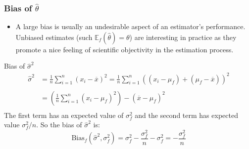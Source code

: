 \frame
{
\frametitle{Bias of $\hat{\theta}$}

\begin{itemize}
\item A large bias is usually an undesirable aspect of an estimator's performance. \alert{Unbiased estimates} (such $\mathbb{E}_f(\hat{\theta})=\theta$) are interesting in practice as they promote a nice feeling of scientific objectivity in the estimation process. 
\end{itemize}

\begin{exampleblock}{Bias of $\hat{\sigma}^2$}
$$
\begin{array}{ll}
\hat{\sigma}^2&=\frac{1}{n} \sum_{i=1}^{n} (x_i-\overline{x})^{2}=\frac{1}{n} \sum_{i=1}^{n} ((x_i-\mu_f)+ (\mu_f-\overline{x}))^{2}\\
&\\
&=\left(\frac{1}{n}  \sum_{i=1}^{n} (x_i-\mu_f)^2 \right)-  (\overline{x}-\mu_f)^2\\
\end{array}
$$
The first term has an expected value of $\sigma_f^2$ and the second term has expected value $\sigma_f^2/n$. So the bias of  $\hat{\sigma}^2$ is:
$$
\mathrm{Bias}_{f}(\hat{\sigma}^2,\sigma_f^2)=\sigma_f^2-\frac{\sigma_f^2}{n}-\sigma_f^2=-\frac{\sigma_f^2}{n}
$$ 
\end{exampleblock}
}
